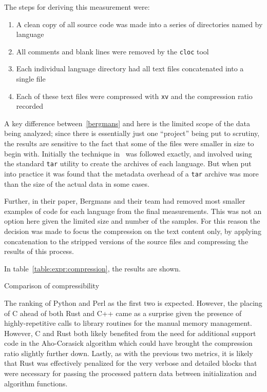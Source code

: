 The steps for deriving this measurement were:

\begin{enumerate}
\item A clean copy of all source code was made into a series of directories named by language
\item All comments and blank lines were removed by the \texttt{cloc} tool
\item Each individual language directory had all text files concatenated into a single file
\item Each of these text files were compressed with \texttt{xv} and the compression ratio recorded
\end{enumerate}

A key difference between~\ref{bergmans} and here is the limited scope of the data being analyzed; since there is essentially just one ``project'' being put to scrutiny, the results are sensitive to the fact that some of the files were smaller in size to begin with. Initially the technique in~\cite{bergmans} was followed exactly, and involved using the standard \texttt{tar} utility to create the archives of each language. But when put into practice it was found that the metadata overhead of a \texttt{tar} archive was more than the size of the actual data in some cases.

Further, in their paper, Bergmans and their team had removed most smaller examples of code for each language from the final measurements. This was not an option here given the limited size and number of the samples. For this reason the decision was made to focus the compression on the text content only, by applying concatenation to the stripped versions of the source files and compressing the results of this process.

In table~\ref{table:expr:compression}, the results are shown.

\begin{table}[!htb]

\caption{Comparison of compressibility}
\label{table:expr:compression}
\end{table}

The ranking of Python and Perl as the first two is expected. However, the placing of C ahead of both Rust and C++ came as a surprise given the presence of highly-repetitive calls to library routines for the manual memory management. However, C and Rust both likely benefited from the need for additional support code in the Aho-Corasick algorithm which could have brought the compression ratio slightly further down. Lastly, as with the previous two metrics, it is likely that Rust was effectively penalized for the very verbose and detailed blocks that were necessary for passing the processed pattern data between initialization and algorithm functions.

